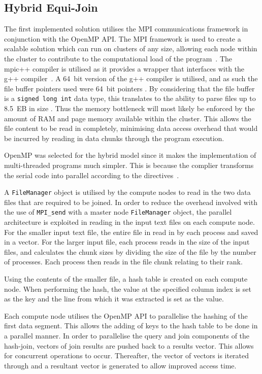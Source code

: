 \documentclass[12pt,twocolumn]{witseiepaper}
\begin{document}
\subsection{Hybrid Equi-Join}
The first implemented solution utilises the MPI communications framework in conjunction with the OpenMP API. The MPI framework is used to create a scalable solution which can run on clusters of any size, allowing each node within the cluster to contribute to the computational load of the program~\cite{mpi-scale}. The mpic++ compiler is utilised as it provides a wrapper that interfaces with the g++ compiler~\cite{mpic++-wrapper}. A 64~bit version of the g++ compiler is utilised, and as such the file buffer pointers used were 64~bit pointers \cite{pointer-size}. By considering that the file buffer is a \texttt{signed long int} data type, this translates to the ability to parse files up to 8.5~EB in size \cite{pointer-size}. Thus the memory bottleneck will most likely be enforced by the amount of RAM and page memory available within the cluster. This allows the file content to be read in completely, minimising data access overhead that would be incurred by reading in data chunks through the program execution.

OpenMP was selected for the hybrid model since it makes the implementation of multi-threaded programs much simpler. This is because the complier transforms the serial code into parallel according to the directives~\cite{comparingMPIMapReduce}.

A \texttt{FileManager} object is utilised by the compute nodes to read in the two data files that are required to be joined. In order to reduce the overhead involved with the use of \texttt{MPI\_send} with a master node \texttt{FileManager} object, the parallel architecture is exploited in reading in the input text files on each compute node. For the smaller input text file, the entire file in read in by each process and saved in a vector. For the larger input file, each process reads in the size of the input files, and calculates the chunk sizes by dividing the size of the file by the number of processes. Each process then reads in the file chunk relating to their rank.

Using the contents of the smaller file, a hash table is created on each compute node. When performing the hash, the value at the specified column index is set as the key and the line from which it was extracted is set as the value.

Each compute node utilises the OpenMP API to parallelise the hashing of the first data segment. This allows the adding of keys to the hash table to be done in a parallel manner. In order to parallelise the query and join components of the hash-join, vectors of join results are pushed back to a results vector. This allows for concurrent operations to occur. Thereafter, the vector of vectors is iterated through and a resultant vector is generated to allow improved access time.
\end{document}

